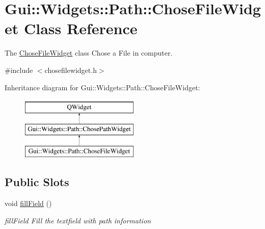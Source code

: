 \hypertarget{classGui_1_1Widgets_1_1Path_1_1ChoseFileWidget}{\section{Gui\-:\-:Widgets\-:\-:Path\-:\-:Chose\-File\-Widget Class Reference}
\label{classGui_1_1Widgets_1_1Path_1_1ChoseFileWidget}
}


The \hyperlink{classGui_1_1Widgets_1_1Path_1_1ChoseFileWidget}{Chose\-File\-Widget} class Chose a File in computer.  




{\ttfamily \#include $<$chosefilewidget.\-h$>$}

Inheritance diagram for Gui\-:\-:Widgets\-:\-:Path\-:\-:Chose\-File\-Widget\-:\begin{figure}[H]
\begin{center}
\leavevmode
\includegraphics[height=3.000000cm]{da/d61/classGui_1_1Widgets_1_1Path_1_1ChoseFileWidget}
\end{center}
\end{figure}
\subsection*{Public Slots}
\begin{DoxyCompactItemize}
\item 
\hypertarget{classGui_1_1Widgets_1_1Path_1_1ChoseFileWidget_af3ec8425f422362a1f4699b0cd554113}{void \hyperlink{classGui_1_1Widgets_1_1Path_1_1ChoseFileWidget_af3ec8425f422362a1f4699b0cd554113}{fill\-Field} ()}\label{classGui_1_1Widgets_1_1Path_1_1ChoseFileWidget_af3ec8425f422362a1f4699b0cd554113}

\begin{DoxyCompactList}\small\item\em fill\-Field Fill the textfield with path information \end{DoxyCompactList}\end{DoxyCompactItemize}
